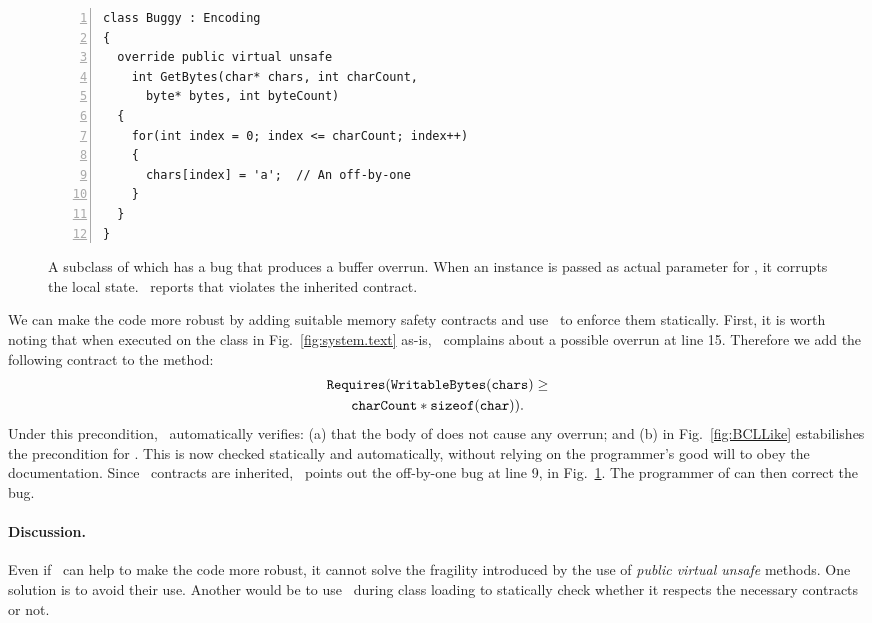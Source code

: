 \documentclass[10pt]{sigplanconf}
\newcommand{\mafcomment}[1]{{}}
\begin{document}
\begin{figure}[t]
\begin{lstlisting}[numbers=left]
class Buggy : Encoding
{
  override public virtual unsafe 
    int GetBytes(char* chars, int charCount, 
      byte* bytes, int byteCount)
  { 
    for(int index = 0; index <= charCount; index++)
    {
      chars[index] = 'a';  // An off-by-one 
    }
  }
}
\end{lstlisting}
\caption{A subclass of  which has a bug that produces a buffer overrun. When an instance is passed as actual parameter for , it corrupts  the local state. 
\Clousot\ reports that  violates the inherited contract. }
\label{fig:GetBytesBug}
\end{figure}

We can make the code more robust by adding suitable memory safety
contracts and use \Clousot\ to enforce them statically.  First, it is
worth noting that when executed on the class in
Fig.~\ref{fig:system.text} as-is, \Clousot\ complains about a possible
overrun at line 15.  Therefore we add the following contract to the
method:
\begin{multline*}
\mathtt{Requires(WritableBytes(chars)}  \geq \\
\mathtt{charCount*sizeof(char))}.
\end{multline*}
Under this precondition, \Clousot\ automatically verifies: (a) that the body of  does not cause any overrun;  and (b)  in Fig.~\ref{fig:BCLLike} estabilishes the precondition for . 
This is now checked statically and automatically, without relying on the programmer's good will to obey the documentation.
Since \Foxtrot\ contracts are inherited, \Clousot\ points out the
off-by-one bug at line 9, in Fig.~\ref{fig:GetBytesBug}.   
The programmer of  can then correct the bug.

\paragraph{Discussion.}
Even if \Clousot\ can help to make the code more robust, it cannot solve the fragility introduced by the use of \emph{public virtual unsafe} methods.
One solution is to avoid their use.
Another would be to use \Clousot\ during class loading to statically
check whether it respects the necessary contracts or not.
\mafcomment{MAF: code with unsafe (such as the implementation of buggy)
  can only be run in untrusted environments anyway. One can think of enforcing an integrity policy such that: if it cannot be proven that a subclass specifies the specification, then  its execution in an untrusted environment is denied, ~\cite{necula97,LogozzoCortesi06}.
}
\end{document}
